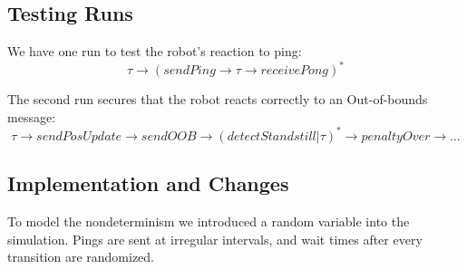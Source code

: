 \documentclass[12pt]{article}
\begin{document}
\subsection*{Testing Runs}
We have one run to test the robot's reaction to ping:
\[ \tau \rightarrow (sendPing \rightarrow \tau \rightarrow receivePong)^{*}  \] 

\flushleft
The second run secures that the robot reacts correctly to an Out-of-bounds message:
\[ \tau \rightarrow sendPosUpdate\rightarrow sendOOB \rightarrow (detectStandstill | \tau )^{*} \rightarrow penaltyOver \rightarrow \dots \]

\subsection*{Implementation and Changes}
To model the nondeterminism we introduced a random variable into the simulation. Pings are sent at irregular intervals, and wait times after every transition are randomized.
\end{document}

